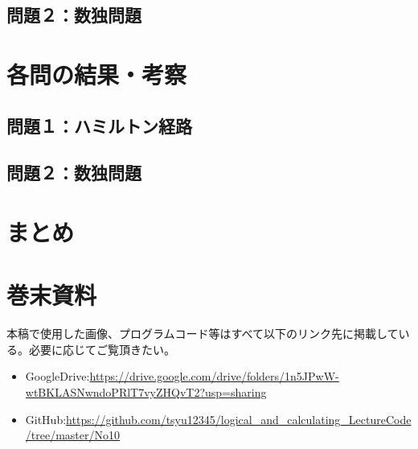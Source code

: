 \documentclass[dvipdfmx]{jsarticle}
\begin{document}
\subsection{問題２：数独問題}

\section{各問の結果・考察}
\subsection{問題１：ハミルトン経路}
\subsection{問題２：数独問題}

\section{まとめ}
\section{巻末資料}
本稿で使用した画像、プログラムコード等はすべて以下のリンク先に掲載している。必要に応じてご覧頂きたい。
\begin{itemize}
  \item GoogleDrive:\url{https://drive.google.com/drive/folders/1n5JPwW-wtBKLASNwndoPRlT7vyZHQvT2?usp=sharing}
  \item GitHub:\url{https://github.com/tsyu12345/logical_and_calculating_LectureCode/tree/master/No10}
\end{itemize}
\end{document}
